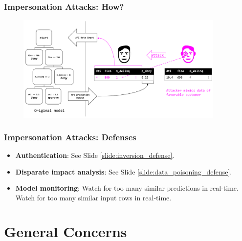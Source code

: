 \documentclass[11pt,
               aspectratio=169,
               hyperref={colorlinks}
               ]{beamer}
\begin{document}
			\begin{frame}
		
				\frametitle{Impersonation Attacks: \textbf{How?}}		
			
				\begin{figure}[htb]
					\begin{center}
						\includegraphics[height=150pt]{img/imperson.PNG}
					\end{center}
				\end{figure}	
				
			\end{frame}
			
			\begin{frame}
		
				\frametitle{Impersonation Attacks: \textbf{Defenses}}		
			
				\begin{itemize}
					\item \textbf{Authentication}: See Slide \ref{slide:inversion_defense}. 
					\item \textbf{Disparate impact analysis}: See Slide \ref{slide:data_poisoning_defense}.
					\item \textbf{Model monitoring}: Watch for too many similar predictions in real-time. Watch for too many similar input rows in real-time.
				\end{itemize}
				
			\end{frame}

	\section{General Concerns}
\end{document}
